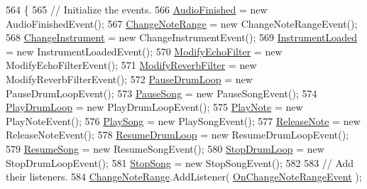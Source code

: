 \begin{DoxyCode}
564     \{
565         \textcolor{comment}{// Initialize the events.}
566         \hyperlink{group___v_i_m_events_ga39ffa8215ab5c9ad46c563e2bd87c219}{AudioFinished} = \textcolor{keyword}{new} AudioFinishedEvent();
567         \hyperlink{group___v_i_m_events_gab6fa99d08e8466406835b9fc4ff859f1}{ChangeNoteRange} = \textcolor{keyword}{new} ChangeNoteRangeEvent();
568         \hyperlink{group___v_i_m_events_ga1b9f12a73a5418ea5695d38b78c506c4}{ChangeInstrument} = \textcolor{keyword}{new} ChangeInstrumentEvent();
569         \hyperlink{group___v_i_m_events_gad79b789b020d7e4a8c149ec653c0b97f}{InstrumentLoaded} = \textcolor{keyword}{new} InstrumentLoadedEvent();
570         \hyperlink{group___v_i_m_events_ga112ed15f48fd261f1ad71c3c953c0a58}{ModifyEchoFilter} = \textcolor{keyword}{new} ModifyEchoFilterEvent();
571         \hyperlink{group___v_i_m_events_gaadd137e073cb3849f610a46e0d032858}{ModifyReverbFilter} = \textcolor{keyword}{new} ModifyReverbFilterEvent();
572         \hyperlink{group___v_i_m_events_ga6de00a430321852cc3c8c4a213d62c70}{PauseDrumLoop} = \textcolor{keyword}{new} PauseDrumLoopEvent();
573         \hyperlink{group___v_i_m_events_gae2d76fc98161d7a4573628dbd93e7887}{PauseSong} = \textcolor{keyword}{new} PauseSongEvent();
574         \hyperlink{group___v_i_m_events_ga5657ff4bcc7de6d240d7092ffd22a6fe}{PlayDrumLoop} = \textcolor{keyword}{new} PlayDrumLoopEvent();
575         \hyperlink{group___v_i_m_events_gaa21021c13a8c9d13cbf374d5bf9d68fa}{PlayNote} = \textcolor{keyword}{new} PlayNoteEvent();
576         \hyperlink{group___v_i_m_events_gae450bdba9c513ab4e43f69def50fa84d}{PlaySong} = \textcolor{keyword}{new} PlaySongEvent();
577         \hyperlink{group___v_i_m_events_ga3a1726a6366126421434c2c7be5e5678}{ReleaseNote} = \textcolor{keyword}{new} ReleaseNoteEvent();
578         \hyperlink{group___v_i_m_events_ga54db2dc24076cd3cd130e95c2fd5bea0}{ResumeDrumLoop} = \textcolor{keyword}{new} ResumeDrumLoopEvent();
579         \hyperlink{group___v_i_m_events_ga01670916ae3917c84a0fb51667f30ab9}{ResumeSong} = \textcolor{keyword}{new} ResumeSongEvent();
580         \hyperlink{group___v_i_m_events_ga9466995fd3b4a07351a8577042ee8b31}{StopDrumLoop} = \textcolor{keyword}{new} StopDrumLoopEvent();
581         \hyperlink{group___v_i_m_events_gaa9e464629814abf2e4db88e240fac72c}{StopSong} = \textcolor{keyword}{new} StopSongEvent();
582 
583         \textcolor{comment}{// Add their listeners.}
584         \hyperlink{group___v_i_m_events_gab6fa99d08e8466406835b9fc4ff859f1}{ChangeNoteRange}.AddListener( \hyperlink{group___v_i_m_handlers_ga660c766dceebfc830de2cf96686692df}{OnChangeNoteRangeEvent} );

\end{DoxyCode}
